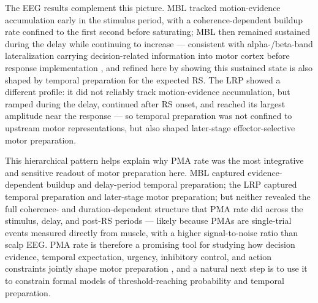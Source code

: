 The EEG results complement this picture. MBL tracked motion-evidence accumulation early in the stimulus period, with a coherence-dependent buildup rate confined to the first second before saturating; MBL then remained sustained during the delay while continuing to increase --- consistent with alpha-/beta-band lateralization carrying decision-related information into motor cortex before response implementation \parencites{MotorCorticalSignals}{twomeyAbstractEffectorSelectiveDecision2016}, and refined here by showing this sustained state is also shaped by temporal preparation for the expected RS. The LRP showed a different profile: it did not reliably track motion-evidence accumulation, but ramped during the delay, continued after RS onset, and reached its largest amplitude near the response --- so temporal preparation was not confined to upstream motor representations, but also shaped later-stage effector-selective motor preparation.

This hierarchical pattern helps explain why PMA rate was the most integrative and sensitive readout of motor preparation here. MBL captured evidence-dependent buildup and delay-period temporal preparation; the LRP captured temporal preparation and later-stage motor preparation; but neither revealed the full coherence- and duration-dependent structure that PMA rate did across the stimulus, delay, and post-RS periods --- likely because PMAs are single-trial events measured directly from muscle, with a higher signal-to-noise ratio than scalp EEG. PMA rate is therefore a promising tool for studying how decision evidence, temporal expectation, urgency, inhibitory control, and action constraints jointly shape motor preparation \parencites{balsdonSecondaryMotorIntegration2023}{dendauwGatedCascadeDiffusion2024}{ramayyaHumanResponseTimes2025}{MotorCorticalSignals}{servantIntegratedTheoryDeciding2021}, and a natural next step is to use it to constrain formal models of threshold-reaching probability and temporal preparation.


